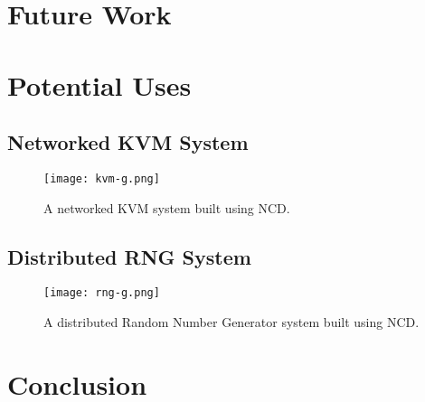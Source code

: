\documentclass[11pt,twocolumn]{article}
\begin{document}
\section{Future Work}
\label{sec:futurework}



\section{Potential Uses}
\label{sec:potentialuses}

\subsection{Networked KVM System}
\label{sec:networkedkvm}

\begin{figure}[h]
  \centering
  \texttt{[image: kvm-g.png]}
  \caption{A networked KVM system built using NCD.}
  \label{fig:kvm}
\end{figure}

\subsection{Distributed RNG System}
\label{sec:distributedrng}

\begin{figure}[h]
  \centering
  \texttt{[image: rng-g.png]}
  \caption{A distributed Random Number Generator system built using NCD.}
  \label{fig:rng}
\end{figure}

\section{Conclusion}
\label{sec:conclusion}

\nocite{*}

\end{document}
